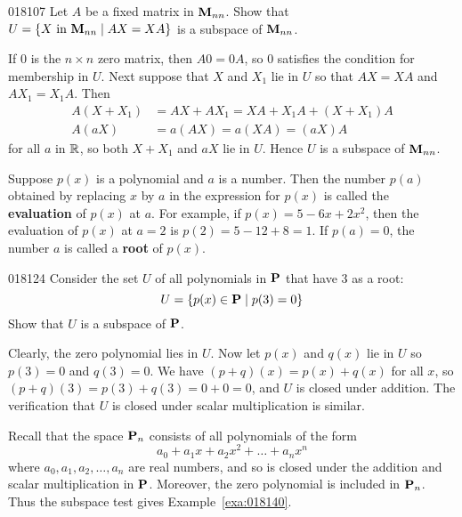 \begin{example}{}{018107}
Let $A$ be a fixed matrix in $\textbf{M}_{nn}$. Show that $U = \{X\mbox{ in } \textbf{M}_{nn} \mid AX = XA\}$ is a subspace of $\textbf{M}_{nn}$.

\begin{solution}
If $0$ is the $n \times n$ zero matrix, then $A0 = 0A$, so $0$ satisfies the condition for membership in $U$. Next suppose that $X$ and $X_{1}$ lie in $U$ so that $AX = XA$ and $AX_{1} = X_{1}A$. Then
\begin{align*}
A(X + X_1) 	&= AX + AX_1 = XA + X_1A + (X + X_1)A \\
A(aX) 		&= a(AX) = a(XA) = (aX)A
\end{align*}
for all $a$ in $\mathbb{R}$, so both $X + X_{1}$ and $aX$ lie in $U$. Hence $U$ is a subspace of $\textbf{M}_{nn}$.
\end{solution}
\end{example}

Suppose $p(x)$ is a polynomial and $a$ is a number. Then the number $p(a)$ obtained by replacing $x$ by $a$ in the expression for $p(x)$ is called the \textbf{evaluation} of $p(x)$ at $a$. For example, if $p(x) = 5 - 6x + 2x^{2}$, then the evaluation of $p(x)$ at $a = 2$ is $p(2) = 5 - 12 + 8 = 1$. If $p(a) = 0$, the number $a$ is called a \textbf{root} of $p(x)$.

\begin{example}{}{018124}
Consider the set $U$ of all polynomials in $\textbf{P}$ that have $3$ as a root:
\begin{equation*}
U = \{p(x) \in \textbf{P} \mid p(3) = 0 \}
\end{equation*}
Show that $U$ is a subspace of $\textbf{P}$.

\begin{solution}
  Clearly, the zero polynomial lies in $U$. Now let $p(x)$ and $q(x)$ lie in $U$ so $p(3) = 0$ and $q(3) = 0$. We have $(p + q)(x) = p(x) + q(x)$ for all $x$, so $(p + q)(3) = p(3) + q(3) = 0 + 0 = 0$, and $U$ is closed under addition. The verification that $U$ is closed under scalar multiplication is similar.
\end{solution}
\end{example}

Recall that the space $\textbf{P}_{n}$ consists of all polynomials of the form
\begin{equation*}
a_0 + a_1x + a_2x^2 + \dots + a_nx^n
\end{equation*}
where $a_{0}, a_{1}, a_{2}, \dots, a_{n}$ are real numbers, and so is closed under the addition and scalar multiplication in $\textbf{P}$. Moreover, the zero polynomial is included in $\textbf{P}_{n}$. Thus the subspace test gives Example~\ref{exa:018140}. 


